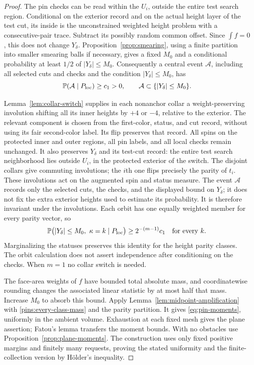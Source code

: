 \begin{proof}
The pin checks can be read within the $U_i$, outside the entire test
search region.  Conditional on the exterior record and on the actual
height layer of the test cut, its inside is the unconstrained weighted
height problem with a consecutive-pair trace.  Subtract its possibly
random common offset.  Since $\int f=0$, this does not change
$Y_\delta$.  Proposition~\ref{prop:smearing}, using a finite partition
into smaller smearing balls if necessary, gives a fixed $M_0$ and a
conditional probability at least $1/2$ of $|Y_\delta|\le M_0$.
Consequently a central event $\mathcal A$, including all selected cuts
and checks and the condition $|Y_\delta|\le M_0$, has
\begin{equation}\label{pins:central-unpartitioned}
 \mathbb P(\mathcal A\mid P_{\mathrm{loc}})\ge c_1>0,
 \qquad \mathcal A\subset\{|Y_\delta|\le M_0\}.
\end{equation}

Lemma~\ref{lem:collar-switch} supplies in each nonanchor collar a
weight-preserving involution shifting all its inner heights by $+4$
or $-4$, relative to the exterior.  The relevant component is chosen
from the first-color, status, and cut record, without using its fair
second-color label.  Its flip preserves that record.  All spins on
the protected inner and outer regions, all pin labels, and all local
checks remain unchanged.  It also preserves $Y_\delta$ and its test-cut
record: the entire test search neighborhood lies outside $U_i$, in the
protected exterior of the switch.  The disjoint collars give commuting involutions;
the $i$th one flips precisely the parity of $t_i$.  These involutions
act on the augmented spin and status measure.  The event $\mathcal A$
records only the selected cuts, the checks, and the displayed bound on
$Y_\delta$; it does not fix the extra exterior heights used to estimate
its probability.  It is therefore invariant under the involutions.
Each orbit has one equally weighted
member for every parity vector, so
\begin{equation}\label{pins:every-class-mass}
 \mathbb P\bigl(|Y_\delta|\le M_0,\ \kappa=k
                   \mid P_{\mathrm{loc}}\bigr)
 \ge 2^{-(m-1)}c_1\quad\text{for every }k.
\end{equation}
Marginalizing the statuses preserves this identity for the height
parity classes.  The orbit calculation does not assert independence
after conditioning on the checks.  When $m=1$ no collar switch is needed.

The face-area weights of $f$ have bounded total absolute mass, and
coordinatewise rounding changes the associated linear statistic by
at most half that mass.  Increase $M_0$ to absorb this bound.  Apply
Lemma~\ref{lem:midpoint-amplification} with
\eqref{pins:every-class-mass} and the parity partition.  It gives
\eqref{eq:pin-moments}, uniformly in the ambient volume.  Exhaustion
at each fixed mesh gives the plane assertion; Fatou's lemma transfers
the moment bounds.  With no obstacles use
Proposition~\ref{prop:plane-moments}.  The construction uses only fixed
positive margins and finitely many requests, proving the stated
uniformity and the finite-collection version by H\"older's inequality.
\end{proof}

